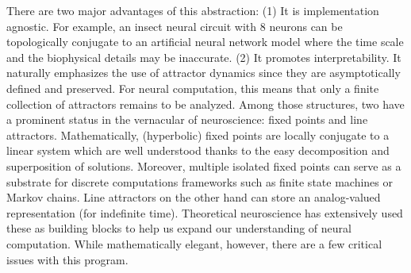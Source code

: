 \documentclass{article}
\theoremstyle{definition} \newtheorem{definition}{Definition}  \newtheorem{example}{Example}
\theoremstyle{remark} \newtheorem{remark}{Remark}
\newcounter{ct}
\begin{document}
There are two major advantages of this abstraction:
(1) It is implementation agnostic. For example, an insect neural circuit with 8 neurons can be topologically conjugate to an artificial neural network model where the time scale and the biophysical details may be inaccurate.
(2) It promotes interpretability.
It naturally emphasizes the use of attractor dynamics since they are asymptotically defined and preserved.
For neural computation, this means that only a finite collection of attractors remains to be analyzed.
Among those structures, two have a prominent status in the vernacular of neuroscience: fixed points and line attractors.
Mathematically, (hyperbolic) fixed points are locally conjugate to a linear system\citep{hartman1960lemma} which are well understood thanks to the easy decomposition and superposition of solutions.
Moreover, multiple isolated fixed points can serve as a substrate for discrete computations frameworks such as finite state machines or Markov chains.
Line attractors on the other hand can store an analog-valued representation (for indefinite time).
Theoretical neuroscience  has extensively used these as building blocks to help us expand our understanding of neural computation\citep{dayan2005theoretical,vyas2020ctd}.
While mathematically elegant, however, there are a few critical issues with this program.
\end{document}
